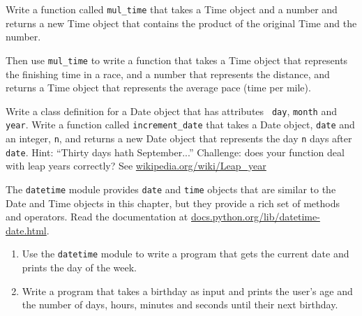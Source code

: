 \documentclass[10pt]{book}
\begin{document}
\begin{ex}
Write a function called \verb"mul_time" that takes a Time object
and a number and returns a new Time object that contains
the product of the original Time and the number.

Then use \verb"mul_time" to write a function that takes a Time
object that represents the finishing time in a race, and a number
that represents the distance, and returns a Time object that represents
the average pace (time per mile).


\end{ex}

\begin{ex}


Write a class definition for a Date object that has attributes {\tt
  day}, {\tt month} and {\tt year}.  Write a function called
\verb"increment_date" that takes a Date object, {\tt date} and an
integer, {\tt n}, and returns a new Date object that
represents the day {\tt n} days after {\tt date}.  Hint:
``Thirty days hath September...''  Challenge: does your function
deal with leap years correctly?  See \url{wikipedia.org/wiki/Leap_year}

\end{ex}


\begin{ex}


The {\tt datetime} module provides {\tt date} and {\tt time} objects
that are similar to the Date and Time objects in this chapter, but
they provide a rich set of methods and operators.  Read the
documentation at \url{docs.python.org/lib/datetime-date.html}.

\begin{enumerate}

\item Use the {\tt datetime} module to write a program that
gets the current date and prints the day of the week.


\item Write a program that takes a birthday as input
and prints the user's age and the number of days, hours,
minutes and seconds until their next birthday.
\end{enumerate}

\end{ex}
\end{document}
